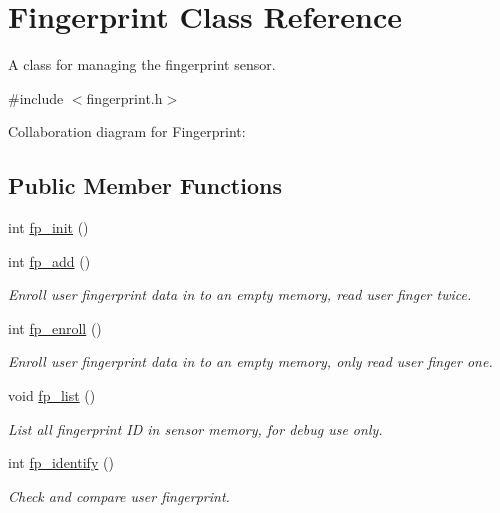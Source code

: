 \hypertarget{class_fingerprint}{}\section{Fingerprint Class Reference}
\label{class_fingerprint}


A class for managing the fingerprint sensor.  




{\ttfamily \#include $<$fingerprint.\+h$>$}



Collaboration diagram for Fingerprint\+:
\subsection*{Public Member Functions}
\begin{DoxyCompactItemize}
\item 
int \hyperlink{class_fingerprint_ad199706762803a08154e147d82b0c867}{fp\+\_\+init} ()
\item 
int \hyperlink{class_fingerprint_a1cc52c07387ff07cc26427cb9d3f3d71}{fp\+\_\+add} ()
\begin{DoxyCompactList}\small\item\em Enroll user fingerprint data in to an empty memory, read user finger twice. \end{DoxyCompactList}\item 
int \hyperlink{class_fingerprint_a15586c8d302933731eca34e4242edbb2}{fp\+\_\+enroll} ()
\begin{DoxyCompactList}\small\item\em Enroll user fingerprint data in to an empty memory, only read user finger one. \end{DoxyCompactList}\item 
void \hyperlink{class_fingerprint_a33ad88ae9e4c9d7277a465905e989dc6}{fp\+\_\+list} ()
\begin{DoxyCompactList}\small\item\em List all fingerprint I\+D in sensor memory, for debug use only. \end{DoxyCompactList}\item 
int \hyperlink{class_fingerprint_a402792facf78e1ffa848dc95437478e8}{fp\+\_\+identify} ()
\begin{DoxyCompactList}\small\item\em Check and compare user fingerprint. \end{DoxyCompactList}\end{DoxyCompactItemize}
